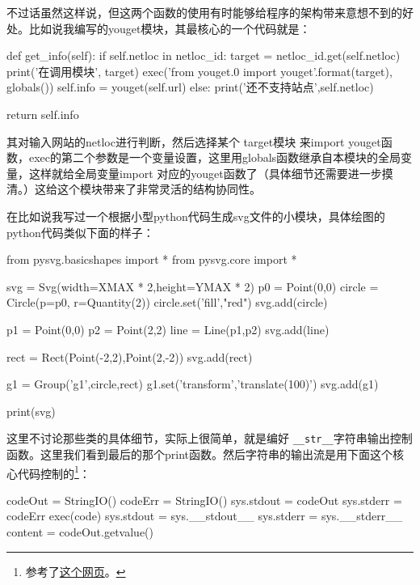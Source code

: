 \documentclass[12pt,oneside]{book}
\begin{document}
\begin{common-format}
不过话虽然这样说，但这两个函数的使用有时能够给程序的架构带来意想不到的好处。比如说我编写的youget模块，其最核心的一个代码就是：

\begin{tcbpython}[]
    def get_info(self):
        if self.netloc in netloc_id:
            target = netloc_id.get(self.netloc)
            print('在调用模块', target)
            exec('from youget.{0} import youget'.format(target), globals())
            self.info = youget(self.url)
        else:
            print('还不支持站点',self.netloc)

        return self.info
\end{tcbpython}

其对输入网站的netloc进行判断，然后选择某个 target模块 来import youget函数，exec的第二个参数是一个变量设置，这里用globals函数继承自本模块的全局变量，这样就给全局变量import 对应的youget函数了（具体细节还需要进一步摸清。）这给这个模块带来了非常灵活的结构协同性。

在比如说我写过一个根据小型python代码生成svg文件的小模块，具体绘图的python代码类似下面的样子：

\begin{tcbpython}[]
from pysvg.basicshapes import *
from pysvg.core import *

svg = Svg(width=XMAX * 2,height=YMAX * 2)
p0 = Point(0,0)
circle = Circle(p=p0, r=Quantity(2))
circle.set('fill',"red")
svg.add(circle)

p1 = Point(0,0)
p2 = Point(2,2)
line = Line(p1,p2)
svg.add(line)

rect = Rect(Point(-2,2),Point(2,-2))
svg.add(rect)

g1 = Group('g1',circle,rect)
g1.set('transform','translate(100)')
svg.add(g1)

print(svg)
\end{tcbpython}

这里不讨论那些类的具体细节，实际上很简单，就是编好 \verb+__str__+字符串输出控制函数。这里我们看到最后的那个print函数。然后字符串的输出流是用下面这个核心代码控制的\footnote{参考了\href{http://stackoverflow.com/questions/701802/how-do-i-execute-a-string-containing-python-code-in-python}{这个网页}。}：


\begin{tcbpython}[]
    codeOut = StringIO()
    codeErr = StringIO()
    sys.stdout = codeOut
    sys.stderr = codeErr
    exec(code)
    sys.stdout = sys.__stdout__
    sys.stderr = sys.__stderr__
    content = codeOut.getvalue()
\end{tcbpython}


\end{common-format}
\end{document}
